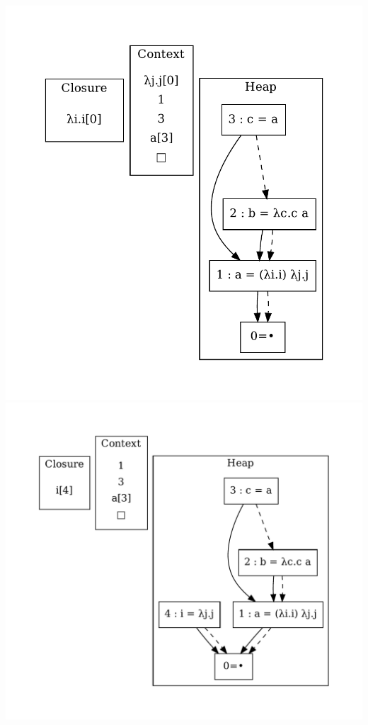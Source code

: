\includegraphics[width=0.99\linewidth/2]{figures/13.pdf}
\includegraphics[width=0.99\linewidth/2]{figures/14.pdf}
